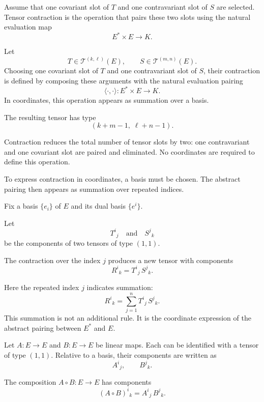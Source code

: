 Assume that one covariant slot of $T$ and one contravariant slot of $S$ are
selected.
Tensor contraction is the operation that pairs these two slots using the
natural evaluation map
\[
E^* \times E \to K.
\]

\begin{definition}
Let
\[
T \in \mathcal{T}^{(k,\ell)}(E),
\qquad
S \in \mathcal{T}^{(m,n)}(E).
\]
Choosing one covariant slot of $T$ and one contravariant slot of $S$, their
contraction is defined by composing these arguments with the natural evaluation
pairing
\[
\langle\cdot,\cdot\rangle : E^* \times E \to K.
\]
In coordinates, this operation appears as summation over a basis.

\medskip

The resulting tensor has type
\[
(k+m-1,\;\ell+n-1).
\]
\end{definition}

\medskip

Contraction reduces the total number of tensor slots by two: one contravariant
and one covariant slot are paired and eliminated.
No coordinates are required to define this operation.

\medskip

To express contraction in coordinates, a basis must be chosen.
The abstract pairing then appears as summation over repeated indices.

\medskip

Fix a basis $\{e_i\}$ of $E$ and its dual basis $\{e^i\}$.

Let
\[
T^{i}{}_{j}
\quad\text{and}\quad
S^{j}{}_{k}
\]
be the components of two tensors of type $(1,1)$.

\medskip

The contraction over the index $j$ produces a new tensor with components
\[
R^{i}{}_{k}
=
T^{i}{}_{j} \, S^{j}{}_{k}.
\]

Here the repeated index $j$ indicates summation:
\[
R^{i}{}_{k}
=
\sum_{j=1}^{n}
T^{i}{}_{j} \, S^{j}{}_{k}.
\]
This summation is not an additional rule.
It is the coordinate expression of the abstract pairing between $E^*$ and $E$.

\medskip

Let $A : E \to E$ and $B : E \to E$ be linear maps.
Each can be identified with a tensor of type $(1,1)$.
Relative to a basis, their components are written as
\[
A^{i}{}_{j},
\qquad
B^{j}{}_{k}.
\]

The composition $A \circ B : E \to E$ has components
\[
(A \circ B)^{i}{}_{k}
=
A^{i}{}_{j} \, B^{j}{}_{k}.
\]

